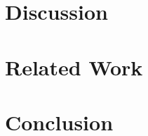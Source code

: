 \documentclass[letterpaper,twocolumn,10pt]{article}
\theoremstyle{definition}
\begin{document}


\section{Discussion}
\label{sec:discussion}



\section{Related Work}
\label{sec:related}



\section{Conclusion}
\label{sec:conclusion}



\balance


\end{document}
